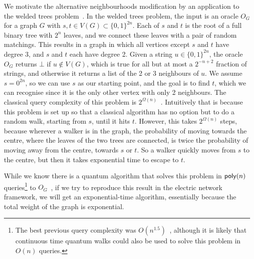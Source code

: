 \documentclass{theoretics}
\renewcommand{\>}{\rangle}
\newcommand{\<}{\langle}
\renewcommand{\(}{\left(}
\renewcommand{\)}{\right)}
\begin{document}
We motivate the alternative neighbourhoods modification by an application to the welded trees problem~\cite{childs2003ExpSpeedupQW}. In the welded trees problem, the input is an oracle $O_G$ for a graph $G$ with $s,t\in V(G)\subset \{0,1\}^{2n}$. Each of $s$ and $t$ is the root of a full binary tree with $2^n$ leaves, and we connect these leaves with a pair of random matchings. This results in a graph in which all vertices except $s$ and $t$ have degree 3, and $s$ and $t$ each have degree 2. Given a string $u\in\{0,1\}^{2n}$, the oracle $O_G$ returns $\bot$ if $u\not\in V(G)$, which is true for all but at most a $2^{-n+2}$ fraction of strings, and otherwise it returns a list of the 2 or 3 neighbours of $u$. We assume $s=0^{2n}$, so we can use $s$ as our starting point, and the goal is to find $t$, which we can recognise since it is the only other vertex with only 2 neighbours. The classical query complexity of this problem is $2^{\Omega(n)}$~\cite{childs2003ExpSpeedupQW}. Intuitively that is because this problem is set up so that a classical algorithm has no option but to do a random walk, starting from $s$, until it hits $t$. However, this takes $2^{\Omega(n)}$ steps, because wherever a walker is in the graph, the probability of moving towards the centre, where the leaves of the two trees are connected, is twice the probability of moving away from the centre, towards $s$ or $t$. So a walker quickly moves from $s$ to the centre, but then it takes exponential time to escape to $t$. 

While we know there is a quantum algorithm that solves this problem in ${\sf poly}(n)$ queries\footnote{The best previous query complexity was $O(n^{1.5})$~\cite{atia2021welded}, although it is likely that continuous time quantum walks could also be used to solve this problem in $O(n)$ queries.} to $O_G$~\cite{childs2003ExpSpeedupQW}, if we try to reproduce this result in the electric network framework, we will get an exponential-time algorithm, essentially because the total weight of the graph is exponential. 
\end{document}
